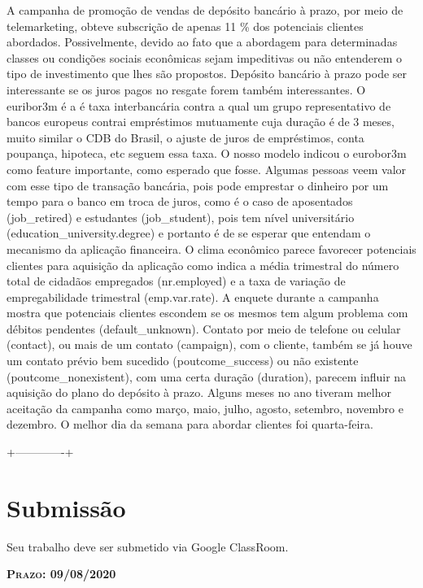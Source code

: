 \documentclass[twoside,conference,a4paper]{IEEEtran}
\begin{document}
A campanha de promoção de vendas de depósito bancário à prazo, por meio de telemarketing, obteve subscrição de apenas 11 \% dos potenciais clientes abordados. Possivelmente, devido ao fato que a abordagem para determinadas classes ou condições sociais econômicas sejam impeditivas ou não entenderem o tipo de investimento que lhes são propostos. Depósito bancário à prazo pode ser interessante se os juros pagos no resgate forem também interessantes. O euribor3m é a é taxa interbancária contra a qual um grupo representativo de bancos europeus contrai empréstimos mutuamente cuja duração é de 3 meses, muito similar o CDB do Brasil, o ajuste de juros de empréstimos, conta poupança, hipoteca, etc seguem essa taxa. O nosso modelo indicou o eurobor3m como feature importante, como esperado que fosse. Algumas pessoas veem valor com esse tipo de transação bancária, pois pode emprestar o dinheiro por um tempo para o banco em troca de juros, como é o caso de aposentados (job\_retired) e estudantes (job\_student), pois tem nível universitário (education\_university.degree) e portanto é de se esperar que entendam o mecanismo da aplicação financeira. O clima econômico parece favorecer potenciais clientes para aquisição da aplicação como indica a média trimestral do número total de cidadãos empregados (nr.employed) e a taxa de variação de empregabilidade trimestral (emp.var.rate). A enquete durante a campanha mostra que potenciais clientes escondem se os mesmos tem algum problema com débitos pendentes (default\_unknown). Contato por meio de telefone ou celular (contact), ou mais de um contato (campaign), com o cliente, também se já houve um contato prévio bem sucedido (poutcome\_success) ou não existente (poutcome\_nonexistent), com uma certa duração (duration), parecem influir na aquisição do plano do depósito à prazo. Alguns meses no ano tiveram melhor aceitação da campanha como março, maio, julho, agosto, setembro, novembro e dezembro. O melhor dia da semana para abordar clientes foi quarta-feira.

 +-------------+







\vspace{20ex}

\section*{\Large \textbf{Submissão}}

Seu trabalho deve ser submetido via Google ClassRoom.

\vspace{3ex}

\begin{center}
 {\Large \textbf{\textsc{Prazo: 09/08/2020}}}
\end{center}
\end{document}
